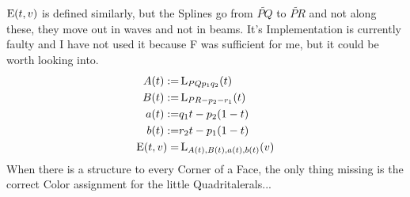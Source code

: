 	$\operatorname{E}(t, v)$ is defined similarly, but the Splines go from $\widetilde{PQ}$ to $\widetilde{PR}$ and not along these, they move out in waves and not in beams. It's Implementation is currently faulty and I have not used it because F was sufficient for me, but it could be worth looking into.
	$$\begin{aligned}
		A(t) :=& \operatorname{L}_{PQp_1q_2}(t) \\
		B(t) :=& \operatorname{L}_{PR-p_2-r_1}(t) \\
		a(t) :=&  q_1t - p_2(1-t) \\
		b(t) :=&  r_2t - p_1(1-t) \\
		\operatorname{E}(t, v) =& \operatorname{L}_{A(t),B(t),a(t),b(t)}(v) \\
	\end{aligned}$$
	When there is a structure to every Corner of a Face, the only thing missing is the correct Color assignment for the little Quadritalerals...
